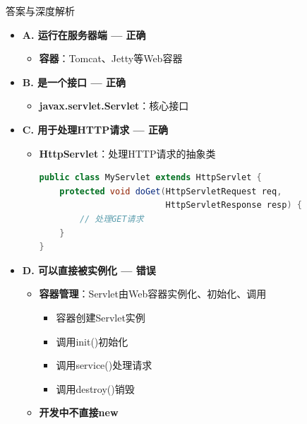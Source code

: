 \documentclass[12pt, a4paper]{ctexart}
\begin{document}
\begin{enumerate}[label=\textbf{\arabic*.}]
\begin{bluebox}{答案与深度解析}
\begin{itemize}[label={}, leftmargin=*, nosep]
		      \item \textbf{A. 运行在服务器端 — 正确}
		      \begin{itemize}[label={}, leftmargin=*, nosep]
			      \item \textbf{容器}：Tomcat、Jetty等Web容器
		      \end{itemize}

		      \item \textbf{B. 是一个接口 — 正确}
		      \begin{itemize}[label={}, leftmargin=*, nosep]
			      \item \textbf{javax.servlet.Servlet}：核心接口
		      \end{itemize}

		      \item \textbf{C. 用于处理HTTP请求 — 正确}
		      \begin{itemize}[label={}, leftmargin=*, nosep]
			      \item \textbf{HttpServlet}：处理HTTP请求的抽象类
			            \begin{lstlisting}[language=Java]
public class MyServlet extends HttpServlet {
    protected void doGet(HttpServletRequest req, 
                         HttpServletResponse resp) {
        // 处理GET请求
    }
}
      \end{lstlisting}
		      \end{itemize}

		      \item \textbf{D. 可以直接被实例化 — 错误}
		      \begin{itemize}[label={}, leftmargin=*, nosep]
			      \item \textbf{容器管理}：Servlet由Web容器实例化、初始化、调用
			            \begin{itemize}[label={}, nosep]
				            \item 容器创建Servlet实例
				            \item 调用init()初始化
				            \item 调用service()处理请求
				            \item 调用destroy()销毁
			            \end{itemize}
			      \item \textbf{开发中不直接new}
		      \end{itemize}

		      \end{itemize}


\end{bluebox}
\end{enumerate}
\end{document}

